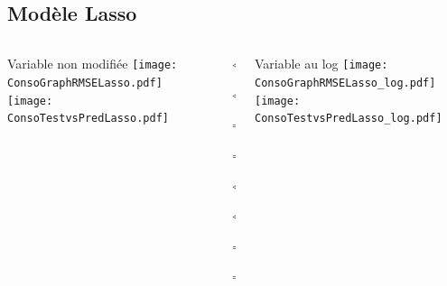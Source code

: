 \documentclass[8pt,aspectratio=169,hyperref={unicode=true}]{beamer}
\begin{document}
\subsection{Modèle Lasso}
\begin{frame}{\insertsubsection}
  \begin{columns}[t]
    \begin{column}{.31\textwidth}
      \centering Variable non modifiée
      \texttt{[image: ConsoGraphRMSELasso.pdf]}
      \texttt{[image: ConsoTestvsPredLasso.pdf]}
    \end{column}
    \begin{column}{.38\textwidth}
      $\Longleftarrow$

      {\footnotesize
          }

      $\Longleftarrow$

      \raggedleft
      $\Longrightarrow$

      {\footnotesize
          }

      $\Longrightarrow$

      \vspace{1cm}

      \raggedright
      $\Longleftarrow$
      {\scriptsize
          }

      $\Longleftarrow$

      \raggedleft
      $\Longrightarrow$

      {\scriptsize
          
        }

      $\Longrightarrow$
    \end{column}
    \begin{column}{.31\textwidth}
      \centering Variable au log
      \texttt{[image: ConsoGraphRMSELasso\_log.pdf]}
      \texttt{[image: ConsoTestvsPredLasso\_log.pdf]}
    \end{column}
  \end{columns}
\end{frame}
\end{document}
